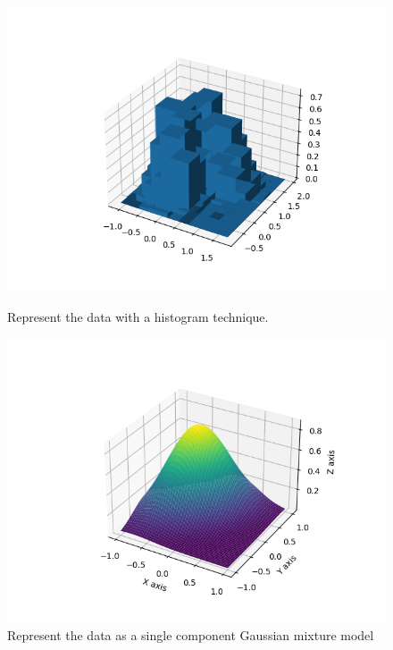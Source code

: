 \documentclass{article}
\begin{document}
\begin{figure}[!htb]
	\centering
	\begin{minipage}{0.49\textwidth}
			\centering
			\includegraphics[width=1\linewidth]{../q1to6pics/q6_hist.png}
			\caption{Represent the data with a histogram technique.}
	\end{minipage}\hfill
	\centering
	\begin{minipage}{0.49\textwidth}
			\centering
			\includegraphics[width=1\linewidth]{../q1to6pics/q6_1.png}
			\caption{Represent the data as a single component Gaussian mixture model}
	\end{minipage}\hfill
	\centering
	\begin{minipage}{0.49\textwidth}
			\centering

\end{minipage}
\end{figure}
\end{document}
